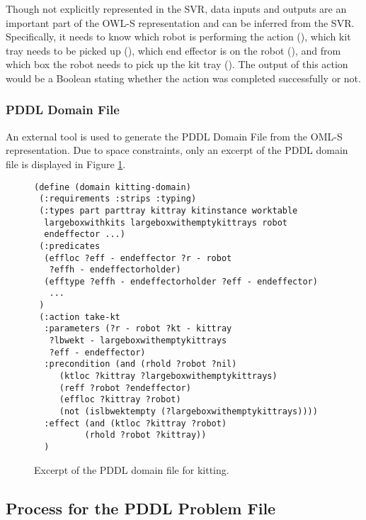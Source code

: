 Though not explicitly represented in the SVR, data inputs and outputs are an important part of the OWL-S representation and can be inferred from the SVR. Specifically, it needs to know which robot is performing the action (), which kit tray needs to be picked up (), which end effector is on the robot (), and from which box the robot needs to pick up the kit tray (). The output of this action would be a Boolean stating whether the action was completed successfully or not.

\subsubsection{PDDL Domain File}
An external tool is used to generate the PDDL Domain File from the OML-S representation. Due to space constraints, only an excerpt of the PDDL domain file is displayed in Figure \ref{fig:domainfile}.

\begin{figure}[h!]
\begin{center}
\begin{minipage}{.5\paperwidth}
\begin{mylisting}
\begin{Verbatim}[commandchars=\\\{\},commandchars=+\[\],fontsize=\scriptsize,numbersep=3pt]
(define (domain kitting-domain)
 (:requirements :strips :typing)
 (:types part parttray kittray kitinstance worktable
  largeboxwithkits largeboxwithemptykittrays robot
  endeffector ...)
 (:predicates
  (effloc ?eff - endeffector ?r - robot
   ?effh - endeffectorholder)
  (efftype ?effh - endeffectorholder ?eff - endeffector)
   ...
 )
 (:action take-kt
  :parameters (?r - robot ?kt - kittray
   ?lbwekt - largeboxwithemptykittrays
   ?eff - endeffector)
  :precondition (and (rhold ?robot ?nil)
     (ktloc ?kittray ?largeboxwithemptykittrays)
     (reff ?robot ?endeffector)
     (effloc ?kittray ?robot)
     (not (islbwektempty (?largeboxwithemptykittrays))))
  :effect (and (ktloc ?kittray ?robot)
          (rhold ?robot ?kittray))
  )
\end{Verbatim}
\end{mylisting}
\end{minipage}
\caption{Excerpt of the PDDL domain file for kitting.\label{fig:domainfile}}
\end{center}
\end{figure}

\subsection{Process for the PDDL Problem File}
\label{subsect:PDDL_Problem_File}


